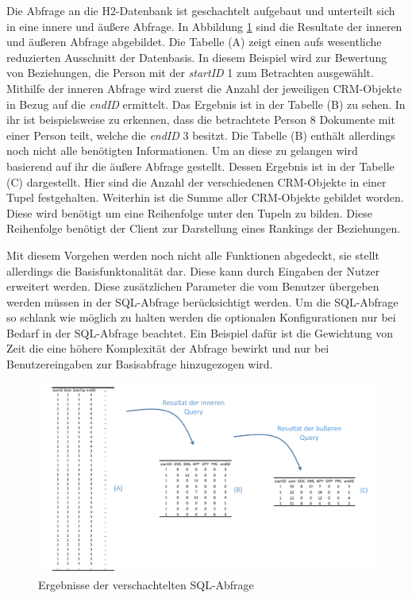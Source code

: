 Die Abfrage an die H2-Datenbank ist geschachtelt aufgebaut und unterteilt sich in eine innere und äußere Abfrage. In Abbildung \ref{umsetzung_sql} sind die Resultate der inneren und äußeren Abfrage abgebildet. Die Tabelle (A) zeigt einen aufs wesentliche reduzierten Ausschnitt der Datenbasis. In diesem Beispiel wird zur Bewertung von Beziehungen, die Person mit der \textit{startID} 1 zum Betrachten ausgewählt. Mithilfe der inneren Abfrage wird zuerst die Anzahl der jeweiligen CRM-Objekte in Bezug auf die \textit{endID} ermittelt. Das Ergebnis ist in der Tabelle (B) zu sehen. In ihr ist beispielsweise zu erkennen, dass die betrachtete Person 8 Dokumente mit einer Person teilt, welche die \textit{endID} 3 besitzt. Die Tabelle (B) enthält allerdings noch nicht alle benötigten Informationen. Um an diese zu gelangen wird basierend auf ihr die äußere Abfrage gestellt. Dessen Ergebnis ist in der Tabelle (C) dargestellt. Hier sind die Anzahl der verschiedenen CRM-Objekte in einer Tupel festgehalten. Weiterhin ist die Summe aller CRM-Objekte gebildet worden. Diese wird benötigt um eine Reihenfolge unter den Tupeln zu bilden. Diese Reihenfolge benötigt der Client zur Darstellung eines Rankings der Beziehungen.

Mit diesem Vorgehen werden noch nicht alle Funktionen abgedeckt, sie stellt allerdings die Basisfunktonalität dar. Diese kann durch Eingaben der Nutzer erweitert werden. Diese zusätzlichen Parameter die vom Benutzer übergeben werden müssen in der SQL-Abfrage berücksichtigt werden. Um die SQL-Abfrage so schlank wie möglich zu halten werden die optionalen Konfigurationen nur bei Bedarf in der SQL-Abfrage beachtet. Ein Beispiel dafür ist die Gewichtung von Zeit die eine höhere Komplexität der Abfrage bewirkt und nur bei Benutzereingaben zur Basisabfrage hinzugezogen wird.


\begin{figure}[htbp]
\centering
  \includegraphics[width=1.0\textwidth]{pics/sql_abfrage.pdf}
\caption{Ergebnisse der verschachtelten SQL-Abfrage}
\label{umsetzung_sql}
\end{figure}

